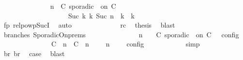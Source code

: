\begin{isabellebody}
\ \ \ \ \ \ \ \ \ \ \ \ \isamarkupfalse%
\ {\isacartoucheopen}{\isacharparenleft}{\isasymGamma}{\isacharcomma}\ n\ {\isasymturnstile}\ {\isacharparenleft}C\ sporadic\ {\isasymtau}\ on\ C\ {\isacharhash}\ {\isasymPsi}\ {\isasymtriangleright}\ {\isasymPhi}{\isacharparenright}\isanewline
\ \ \ \ \ \ \ \ \ \ \ \ \ \ \ \ \ \ \ \ {\isasymhookrightarrow}\isactrlbsup Suc\ k\isactrlesup \ {\isacharparenleft}{\isasymGamma}\isactrlsub k{\isacharcomma}\ Suc\ n\ {\isasymturnstile}\ {\isasymPsi}\isactrlsub k\ {\isasymtriangleright}\ {\isasymPhi}\isactrlsub k{\isacharparenright}{\isacartoucheclose}\isanewline
\ \ \ \ \ \ \ \ \ \ \ \ \ \ \ \ \isamarkupfalse%
\ fp\ relpowp{\isacharunderscore}Suc{\isacharunderscore}I{}\ \isamarkupfalse%
\ auto\isanewline
\ \ \ \ \ \ \ \ \ \ \ \ \isamarkupfalse%
\ rc\ \isamarkupfalse%
\ {\isacharquery}thesis\ \isamarkupfalse%
\ blast\isanewline
\ \ \ \ \ \ \ \ \isamarkupfalse%
\isanewline
\ \ \ \ \ \ \ \ \isamarkupfalse%
\ branches\ SporadicOn{\isachardot}prems{\isacharparenleft}{}{\isacharparenright}\ \isamarkupfalse%
\isanewline
\ \ \ \ \ \ \ \ \ \ {\isacartoucheopen}{\isasymrho}\ {\isasymin}\ {\isasymlbrakk}\ {\isasymGamma}{\isacharcomma}\ n\ {\isasymturnstile}\ {\isasymPsi}\ {\isasymtriangleright}\ {\isacharparenleft}{\isacharparenleft}C\ sporadic\ {\isasymtau}\ on\ C\ {\isacharhash}\ {\isasymPhi}{\isacharparenright}\ {\isasymrbrakk}\isactrlsub c\isactrlsub o\isactrlsub n\isactrlsub f\isactrlsub i\isactrlsub g\isanewline
\ \ \ \ \ \ \ \ \ \ \ \ \ {\isasymunion}\ {\isasymlbrakk}\ {\isacharparenleft}{\isacharparenleft}C\ {\isasymUp}\ n{\isacharparenright}\ {\isacharhash}\ {\isacharparenleft}C\ {\isasymDown}\ n\ {\isacharat}\ {\isasymtau}{\isacharparenright}\ {\isacharhash}\ {\isasymGamma}{\isacharparenright}{\isacharcomma}\ n\ {\isasymturnstile}\ {\isasymPsi}\ {\isasymtriangleright}\ {\isasymPhi}\ {\isasymrbrakk}\isactrlsub c\isactrlsub o\isactrlsub n\isactrlsub f\isactrlsub i\isactrlsub g{\isacartoucheclose}\isanewline
\ \ \ \ \ \ \ \ \ \ \isamarkupfalse%
\ simp\isanewline
\ \ \ \ \ \ \ \ \isamarkupfalse%
\ br{}\ br{}\ \isamarkupfalse%
\ {\isacharquery}case\ \isamarkupfalse%
\ blast\isanewline

\end{isabellebody}
